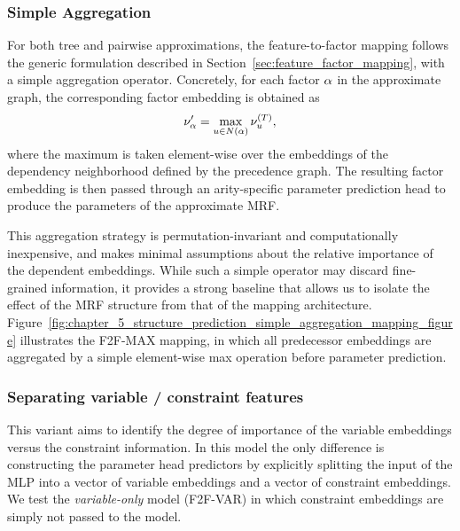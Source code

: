 \subsubsection{Simple Aggregation}
For both tree and pairwise approximations, the feature-to-factor mapping follows the generic formulation described in Section~\ref{sec:feature_factor_mapping}, with a simple aggregation operator. Concretely, for each factor $\alpha$ in the approximate graph, the corresponding factor embedding is obtained as
\begin{equation*}
\nu'_{\alpha} = \max_{u \in N(\alpha)} \nu^{(T)}_u,
\end{equation*}
where the maximum is taken element-wise over the embeddings of the dependency neighborhood defined by the precedence graph. The resulting factor embedding is then passed through an arity-specific parameter prediction head to produce the parameters of the approximate MRF.

This aggregation strategy is permutation-invariant and computationally inexpensive, and makes minimal assumptions about the relative importance of the dependent embeddings. While such a simple operator may discard fine-grained information, it provides a strong baseline that allows us to isolate the effect of the MRF structure from that of the mapping architecture. Figure~\ref{fig:chapter_5_structure_prediction_simple_aggregation_mapping_figure} illustrates the F2F-MAX mapping, in which all predecessor embeddings are aggregated by a simple element-wise max operation before parameter prediction.



\subsubsection{Separating variable / constraint features}
This variant aims to identify the degree of importance of the variable embeddings versus the constraint information. In this model the only difference is constructing the parameter head predictors by explicitly splitting the input of the MLP into a vector of variable embeddings and a vector of constraint embeddings. We test the \emph{variable-only} model (F2F-VAR) in which constraint embeddings are simply not passed to the model.

